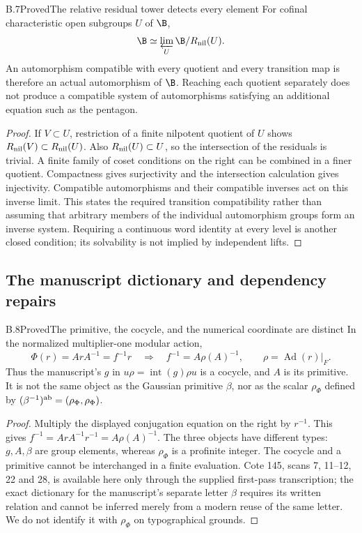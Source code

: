 \begin{statement}{B.7}{Proved}{The relative residual tower detects every element}
For cofinal characteristic open subgroups $U$ of $\B$,
\[
 \B\simeq\varprojlim_U\B/R_{\rm nil}(U).
\]
An automorphism compatible with every quotient and
every transition map is therefore an actual automorphism
of $\B$. Reaching each quotient separately does not
produce a compatible system of automorphisms satisfying
an additional equation such as the pentagon.
\end{statement}
\begin{proof}
If $V\subset U$, restriction of a finite nilpotent
quotient of $U$ shows
$R_{\rm nil}(V)\subset R_{\rm nil}(U)$.
Also $R_{\rm nil}(U)\subset U$, so the intersection
of the residuals is trivial. A finite family of coset
conditions on the right can be combined in a finer
quotient. Compactness gives surjectivity and the
intersection calculation gives injectivity. Compatible
automorphisms and their compatible inverses act on
this inverse limit. This states the required transition
compatibility rather than assuming that arbitrary
members of the individual automorphism groups form
an inverse system. Requiring a continuous word
identity at every level is another closed condition;
its solvability is not implied by independent lifts.
\end{proof}

\subsection{The manuscript dictionary and dependency repairs}

\begin{statement}{B.8}{Proved}{The primitive, the cocycle, and the numerical coordinate are distinct}
In the normalized multiplier-one modular action,
\[
 \Phi(r)=ArA^{-1}=f^{-1}r
 \quad\Longrightarrow\quad
 f^{-1}=A\rho(A)^{-1},\qquad \rho=\operatorname{Ad}(r)|_F.
\]
Thus the manuscript's $g$ in
$u\rho=\operatorname{int}(g)\rho u$ is a cocycle,
and $A$ is its primitive. It is not the same object
as the Gaussian primitive $\beta$, nor as the scalar
$\rho_\Phi$ defined by
$(\beta^{-1})^{\rm ab}=(\rho_\Phi,\rho_\Phi)$.
\end{statement}
\begin{proof}
Multiply the displayed conjugation equation on the
right by $r^{-1}$. This gives
$f^{-1}=ArA^{-1}r^{-1}=A\rho(A)^{-1}$.
The three objects have different types: $g,A,\beta$
are group elements, whereas $\rho_\Phi$ is a profinite
integer. The cocycle and a primitive cannot be
interchanged in a finite evaluation. Cote 145,
scans 7, 11--12, 22 and 28, is available here only
through the supplied first-pass transcription;
the exact dictionary for the manuscript's separate
letter $\beta$ requires its written relation and
cannot be inferred merely from a modern reuse of
the same letter. We do not identify it with
$\rho_\Phi$ on typographical grounds.
\end{proof}

